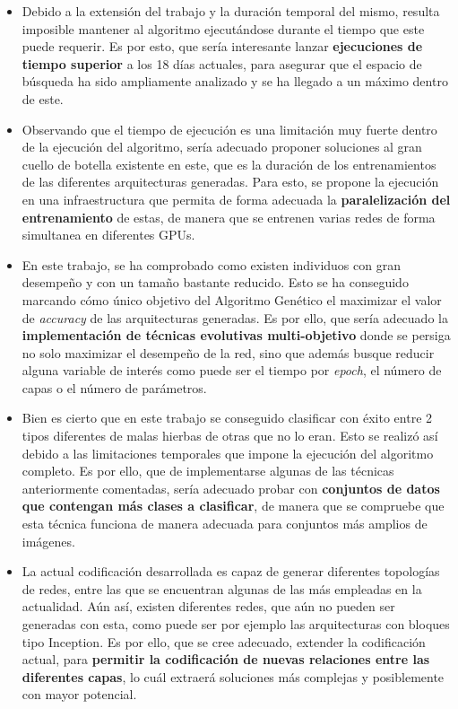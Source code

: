 \begin{itemize}
    \item Debido a la extensión del trabajo y la duración temporal del mismo, resulta imposible mantener al algoritmo ejecutándose durante el tiempo que este puede requerir. Es por esto, que sería interesante lanzar \textbf{ejecuciones de tiempo superior} a los 18 días actuales, para asegurar que el espacio de búsqueda ha sido ampliamente analizado y se ha llegado a un máximo dentro de este.
    
    \item Observando que el tiempo de ejecución es una limitación muy fuerte dentro de la ejecución del algoritmo, sería adecuado proponer soluciones al gran cuello de botella existente en este, que es la duración de los entrenamientos de las diferentes arquitecturas generadas. Para esto, se propone la ejecución en una infraestructura que permita de forma adecuada la \textbf{paralelización del entrenamiento} de estas, de manera que se entrenen varias redes de forma simultanea en diferentes GPUs.
    
    \item En este trabajo, se ha comprobado como existen individuos con gran desempeño y con un tamaño bastante reducido. Esto se ha conseguido marcando cómo único objetivo del Algoritmo Genético el maximizar el valor de \textit{accuracy} de las arquitecturas generadas. Es por ello, que sería adecuado la \textbf{implementación de técnicas evolutivas multi-objetivo} donde se persiga no solo maximizar el desempeño de la red, sino que además busque reducir alguna variable de interés como puede ser el tiempo por \textit{epoch}, el número de capas o el número de parámetros.
    
    \item Bien es cierto que en este trabajo se conseguido clasificar con éxito entre 2 tipos diferentes de malas hierbas de otras que no lo eran. Esto se realizó así debido a las limitaciones temporales que impone la ejecución del algoritmo completo. Es por ello, que de implementarse algunas de las técnicas anteriormente comentadas, sería adecuado probar con \textbf{conjuntos de datos que contengan más clases a clasificar}, de manera que se compruebe que esta técnica funciona de manera adecuada para conjuntos más amplios de imágenes.
    
    \item La actual codificación desarrollada es capaz de generar diferentes topologías de redes, entre las que se encuentran algunas de las más empleadas en la actualidad. Aún así, existen diferentes redes, que aún no pueden ser generadas con esta, como puede ser por ejemplo las arquitecturas con bloques tipo Inception. Es por ello, que se cree adecuado, extender la codificación actual, para \textbf{permitir la codificación de nuevas relaciones entre las diferentes capas}, lo cuál extraerá soluciones más complejas y posiblemente con mayor potencial.
    
\end{itemize}

